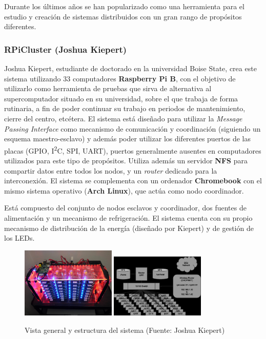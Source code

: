 Durante los últimos años se han popularizado como una herramienta para el estudio y creación de sistemas distribuidos con un gran rango de propósitos diferentes.

\subsubsection{RPiCluster (Joshua Kiepert)}

Joshua Kiepert, estudiante de doctorado en la universidad Boise State, crea este sistema utilizando 33 computadores \textbf{Raspberry Pi B}, con el objetivo de utilizarlo como herramienta de pruebas que sirva de alternativa al supercomputador situado en su universidad\cite{joshuarpicluster}, sobre el que trabaja de forma rutinaria, a fin de poder continuar su trabajo en periodos de mantenimiento, cierre del centro, etcétera. El sistema está diseñado para utilizar la \textit{Message Passing Interface} como mecanismo de comunicación y coordinación (siguiendo un esquema maestro-esclavo) y además poder utilizar los diferentes puertos de las placas (GPIO, I\textsuperscript{2}C, SPI, UART), puertos generalmente ausentes en computadores utilizados para este tipo de propósitos. Utiliza además un servidor \textbf{NFS} para compartir datos entre todos los nodos, y un \textit{router} dedicado para la interconexión. El sistema se complementa con un ordenador \textbf{Chromebook} con el mismo sistema operativo (\textbf{Arch Linux}), que actúa como nodo coordinador.

Está compuesto del conjunto de nodos esclavos y coordinador, dos fuentes de alimentación y un mecanismo de refrigeración. El sistema cuenta con su propio mecanismo de distribución de la energía (diseñado por Kiepert) y de gestión de los LEDs. 


\begin{figure}[H]
\centering
\includegraphics[width=0.4\textwidth]{Chapter1/Figures/kiepert-main}
\includegraphics[width=0.4\textwidth]{Chapter1/Figures/structure.png}
\caption{Vista general y estructura del sistema (Fuente: Joshua Kiepert)}
\label{kiepert:structure}
\end{figure}


